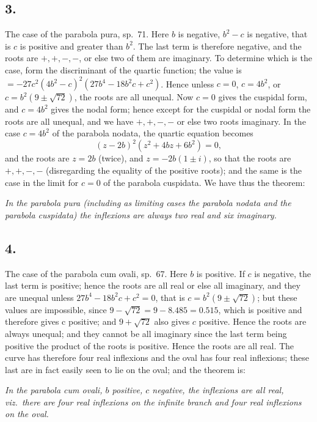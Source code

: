 \documentclass[11pt,a4paper]{article}
\theoremstyle{definition}
\begin{document}
\subsection*{3.}

The case of the parabola pura, sp.~71. Here $b$ is negative, $b^{2} - c$ is negative, that
is $c$ is positive and greater than $b^{2}$. The last term is therefore negative, and the roots
are $+, +, -, -$, or else two of them are imaginary. To determine which is the case,
form the discriminant of the quartic function; the value is $= -27c^{2}(4b^{2} - c)^{2}(27b^{4} - 18b^{2}c + c^{2})$.
Hence unless $c = 0$, $c = 4b^{2}$, or $c = b^{2}(9 \pm \sqrt{72})$, the roots are all unequal. Now $c = 0$ gives
the cuspidal form, and $c = 4b^{2}$ gives the nodal form; hence except for the cuspidal
or nodal form the roots are all unequal, and we have $+, +, -, -$ or else two roots
imaginary. In the case $c = 4b^{2}$ of the parabola nodata, the quartic equation becomes
\[
(z - 2b)^{2}(z^{2} + 4bz + 6b^{2}) = 0,
\]
and the roots are $z = 2b$ (twice), and $z = -2b(1 \pm i)$, so that the roots are $+, +, -, -$
(disregarding the equality of the positive roots); and the same is the case in the limit
for $c = 0$ of the parabola cuspidata. We have thus the theorem:

\textit{In the parabola pura (including as limiting cases the parabola nodata and the parabola
cuspidata) the inflexions are always two real and six imaginary.}

\subsection*{4.}

The case of the parabola cum ovali, sp.~67. Here $b$ is positive. If $c$ is negative,
the last term is positive; hence the roots are all real or else all imaginary, and they
are unequal unless $27b^{4} - 18b^{2}c + c^{2} = 0$, that is $c = b^{2}(9 \pm \sqrt{72})$; but these values are
impossible, since $9 - \sqrt{72} = 9 - 8.485 = 0.515$, which is positive and therefore gives
c positive; and $9 + \sqrt{72}$ also gives $c$ positive. Hence the roots are always unequal; and
they cannot be all imaginary since the last term being positive the product of the roots
is positive. Hence the roots are all real. The curve has therefore four real inflexions
and the oval has four real inflexions; these last are in fact easily seen to lie on the oval;
and the theorem is:

\textit{In the parabola cum ovali, $b$ positive, $c$ negative, the inflexions are all real, viz.\ there
are four real inflexions on the infinite branch and four real inflexions on the oval.}
\end{document}
